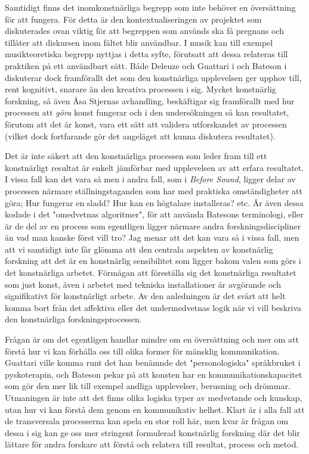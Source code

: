 \documentclass[11pt]{article}
\begin{document}
Samtidigt finns det inomkonstnärliga begrepp som inte behöver en
översättning för att fungera. För detta är den kontextualiseringen av
projektet som diskuterades ovan viktig för att begreppen som används ska
få pregnans och tillåter att diskursen inom fältet blir användbar. I
musik kan till exempel musikteoretiska begrepp nyttjas i detta syfte,
förutsatt att dessa relateras till praktiken på ett användbart sätt.
Både Deleuze och Guattari i och Bateson i diskuterar dock framförallt
det som den konstnärliga upplevelsen ger upphov till, rent kognitivt,
snarare än den kreativa processen i sig. Mycket konstnärlig forskning,
så även Åsa Stjernas avhandling, beskäftigar sig framförallt med hur
processen att \emph{göra} konst fungerar och i den undersökningen så kan
resultatet, förutom att det är konst, vara ett sätt att validera
utforskandet av processen (vilket dock fortfarande gör det angeläget att
kunna diskutera resultatet).

Det är inte säkert att den konstnärliga processen som leder fram till
ett konstnärligt resultat är enkelt jämförbar med upplevelsen av att
erfara resultatet. I vissa fall kan det vara så men i andra fall, som i
\emph{Before Sound}, ligger delar av processen närmare ställningstaganden som
har med praktiska omständigheter att göra; Hur fungerar en sladd? Hur
kan en högtalare installeras? etc. Är även dessa kodade i det
"omedvetnas algoritmer", för att använda Batesons terminologi, eller är
de del av en process som egentligen ligger närmare andra
forskningsdiscipliner än vad man kanske först vill tro? Jag menar att
det kan vara så i vissa fall, men att vi samtidigt inte får glömma att
den centrala aspekten av konstnärlig forskning att det är en konstnärlig
sensibilitet som ligger bakom valen som görs i det konstnärliga arbetet.
Förmågan att föreställa sig det konstnärliga resultatet som just konst,
även i arbetet med tekniska installationer är avgörande och
signifikativt för konstnärligt arbete. Av den anledningen är det svårt
att helt komma bort från det affektiva eller det undermedvetnas logik
när vi vill beskriva den konstnärliga forskningsprocessen.

Frågan är om det egentligen handlar mindre om en översättning och mer om
att förstå hur vi kan förhålla oss till olika former för mänsklig
kommunikation. Guattari ville komma runt det han benämnde det
"personologiska" språkbruket i pyskoterapin, och Bateson pekar på att
konsten har en kommunikationskapacitet som gör den mer lik till exempel
andliga upplevelser, berusning och drömmar. Utmaningen är inte att det
finns olika logiska typer av medvetande och kunskap, utan hur vi kan
förstå dem genom en kommunikativ helhet. Klart är i alla fall att de
transversala processerna kan spela en stor roll här, men kvar är frågan
om dessa i sig kan ge oss mer stringent formulerad konstnärlig forskning
där det blir lättare för andra forskare att förstå och relatera till
resultat, process och metod.
\end{document}

